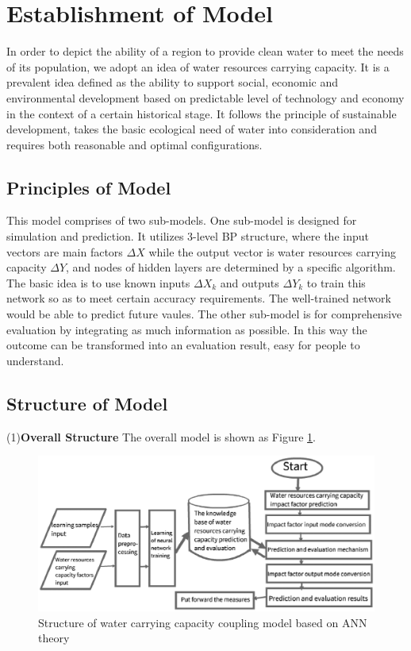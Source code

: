 \section{Establishment of Model}
In order to depict the ability of a region to provide clean water to meet the needs of its population, we adopt an idea of water resources carrying capacity\cite{2}. It is a prevalent idea defined as the ability to support social, economic and environmental development based on predictable level of technology and economy in the context of a certain historical stage. It follows the principle of sustainable development, takes the basic ecological need of water into consideration and requires both reasonable and optimal configurations.

\subsection{Principles of Model}

This model comprises of two sub-models. One sub-model is designed for simulation and prediction. It utilizes 3-level BP structure, where the input vectors are main factors $\Delta X$ while the output vector is water resources carrying capacity $\Delta Y$, and nodes of hidden layers are determined by a specific algorithm. The basic idea is to use known inputs $\Delta X_k$ and outputs $\Delta Y_k$ to train this network so as to meet certain accuracy requirements. The well-trained network would be able to predict future vaules. The other sub-model is for comprehensive evaluation by integrating as much information as possible. In this way the outcome can be transformed into an evaluation result, easy for people to understand\cite{Wengao Lou}.

\subsection{Structure of Model}
(1)\textbf{Overall Structure} The overall model is shown as Figure \ref{overallstructure}.
\begin{figure}[h]
\small
\centering
\includegraphics[width=12cm]{./picture/structure.eps}
\caption{Structure of water carrying capacity coupling model based on ANN theory} \label{overallstructure}
\end{figure}

